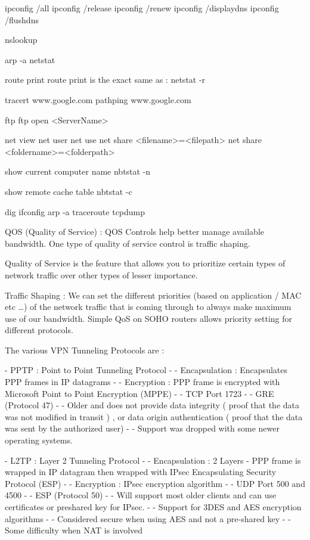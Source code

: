 





ipconfig /all
ipconfig /release
ipconfig /renew
ipconfig /displaydns
ipconfig /flushdns

nslookup

arp -a
netstat

route print
route print is the exact same as : netstat -r

tracert www.google.com
pathping www.google.com

ftp
ftp open <ServerName>

net view
net user
net use
net share <filename>=<filepath>
net share <foldername>=<folderpath>


show current computer name
nbtstat -n

show remote cache table
nbtstat -c






dig
ifconfig
arp -a
traceroute
tcpdump




QOS (Quality of Service) : QOS Controls help better manage available bandwidth.
One type of quality of service control is traffic shaping.

Quality of Service is the feature that allows you to prioritize certain types of
network traffic over other types of lesser importance.


Traffic Shaping : We can set the different priorities (based on application /
MAC etc \ldots ) of the network traffic that is coming through to always make
maximum use of our bandwidth. Simple QoS on SOHO routers allows priority setting
for different protocols.


The various VPN Tunneling Protocols are :

- PPTP : Point to Point Tunneling Protocol
- - Encapsulation : Encapsulates PPP frames in IP datagrams
- - Encryption : PPP frame is encrypted with Microsoft Point to Point Encryption
(MPPE)
- - TCP Port 1723
- - GRE (Protocol 47)
- - Older and does not provide data integrity ( proof that the data was not
modified in transit ) , or data origin authentication ( proof that the data was
sent by the authorized user)
- - Support was dropped with some newer operating systems.

- L2TP : Layer 2 Tunneling Protocol
- - Encapsulation : 2 Layers - PPP frame is wrapped in IP datagram then wrapped
with IPsec Encapsulating Security Protocol (ESP)
- - Encryption : IPsec encryption algorithm
- - UDP Port 500 and 4500
- - ESP (Protocol 50)
- - Will support most older clients and can use certificates or preshared key
for IPsec.
- - Support for 3DES and AES encryption algorithms
- - Considered secure when using AES and not a pre-shared key
- - Some difficulty when NAT is involved

